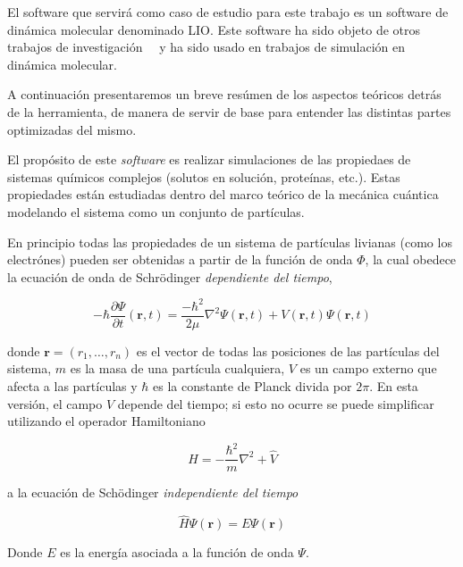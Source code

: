 El software que servirá como caso de estudio para este trabajo es un software de 
din\'amica molecular denominado LIO. Este software ha sido objeto de otros 
trabajos de investigación~\cite{PaperNitscheManu}~\cite{TesisNitsche} y ha sido 
usado en trabajos de simulaci\'on en din\'amica molecular.

A continuaci\'on presentaremos un breve res\'umen de los aspectos te\'oricos detr\'as de
la herramienta, de manera de servir de base para entender las distintas partes optimizadas
del mismo.

El prop\'osito de este \textit{software} es realizar simulaciones de las propiedaes
de sistemas qu\'imicos complejos (solutos en soluci\'on, prote\'inas, etc.). Estas
propiedades est\'an estudiadas dentro del marco te\'orico de la mec\'anica cu\'antica
modelando el sistema como un conjunto de part\'iculas.

En principio todas las propiedades de un sistema de part\'iculas livianas
(como los electr\'ones) pueden ser obtenidas a partir de la funci\'on de onda $\Phi$,
la cual obedece la ecuaci\'on de onda de Schr\"odinger \textit{dependiente del tiempo},

\begin{equation}
    \label{schro_time_dep}
    -\hbar\frac{\partial \Psi}{\partial t} (\mathbf{r},t) = \frac{-\hbar^2}{2\mu}\nabla^2 \Psi(\mathbf{r},t) + V(\mathbf{r},t) \Psi(\mathbf{r},t)
\end{equation}

donde $\mathbf{r} = (r_1,\dots,r_n)$ es el vector de todas las posiciones de las part\'iculas del sistema,
$m$ es la masa de una part\'icula cualquiera, $V$ es un campo externo que afecta a las part\'iculas y
$\hbar$ es la constante de Planck divida por $2\pi$. En esta versi\'on, el campo $V$ depende del tiempo; si
esto no ocurre se puede simplificar utilizando el operador Hamiltoniano

\begin{equation*}
    \hat{H} =  -\frac{\hbar^2}{m} \nabla^2 + \hat{V}
\end{equation*}

a la ecuaci\'on de Sch\"odinger \textit{independiente del tiempo}

\begin{equation}
    \label{schro_time_indep}
    \hat{H} \Psi(\mathbf{r}) = E \Psi(\mathbf{r})
\end{equation}

Donde $E$ es la energ\'ia asociada a la funci\'on de onda $\Psi$.

